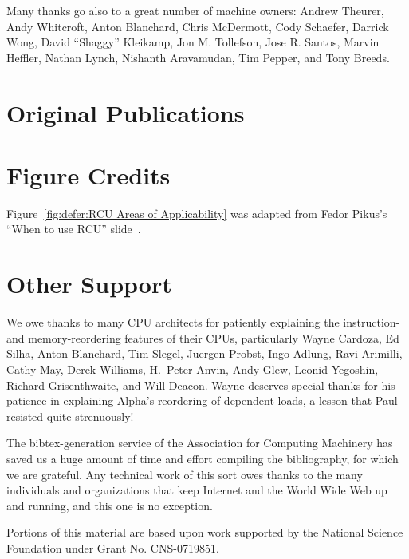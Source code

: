 Many thanks go also to a great number of machine owners:
Andrew Theurer,
Andy Whitcroft,
Anton Blanchard,
Chris McDermott,
Cody Schaefer,
Darrick Wong,
David ``Shaggy'' Kleikamp,
Jon M. Tollefson,
Jose R. Santos,
Marvin Heffler,
Nathan Lynch,
Nishanth Aravamudan,
Tim Pepper,
and
Tony Breeds.

\section{Original Publications}

\ListOriginalPublications

\section{Figure Credits}

\ListContributions

Figure~\ref{fig:defer:RCU Areas of Applicability} was adapted from
Fedor Pikus's ``When to use RCU'' slide~\cite{FedorPikus2017RCUthenWhat}.

\section{Other Support}

We owe thanks to many CPU architects for patiently explaining the
instruction- and memory-reordering features of their CPUs, particularly
Wayne Cardoza, Ed Silha, Anton Blanchard, Tim Slegel, Juergen Probst,
Ingo Adlung, Ravi Arimilli, Cathy May, Derek Williams,
H.~Peter Anvin,
Andy Glew, Leonid Yegoshin,
Richard Grisenthwaite, and Will Deacon.
Wayne deserves special thanks for his patience in explaining Alpha's reordering
of dependent loads, a lesson that Paul resisted quite strenuously!

The bibtex-generation service of the Association for Computing Machinery
has saved us a huge amount of time and effort compiling the bibliography,
for which we are grateful.
Any technical work of this sort owes thanks to the many individuals and
organizations that keep Internet and the World Wide Web up and running,
and this one is no exception.

Portions of this material are based upon work supported by the National
Science Foundation under Grant No. CNS-0719851.
